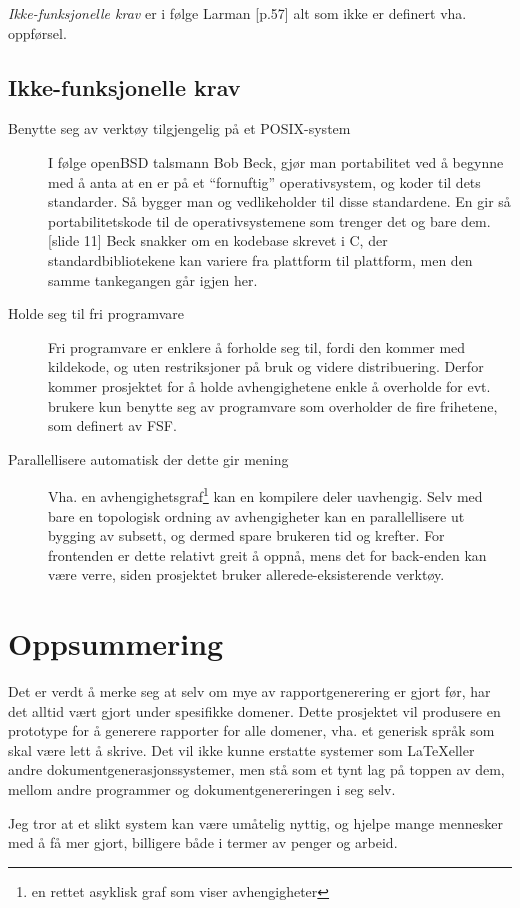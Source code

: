 \documentclass[11pt]{article}
\begin{document}
\emph{Ikke-funksjonelle krav} er i følge Larman \cite{Larman2005}[p.57] alt som ikke er definert vha. oppførsel.

\subsection{Ikke-funksjonelle krav}
\label{subsec:ikke-funksjonelle-krav}
\begin{description}
\item [Benytte seg av verktøy tilgjengelig på et POSIX-system]
  I følge openBSD talsmann Bob Beck,
  gjør man portabilitet ved å begynne med å anta at en er på et ``fornuftig'' operativsystem,
  og koder til dets standarder.
  Så bygger man og vedlikeholder til disse standardene.
  En gir så portabilitetskode til de operativsystemene som trenger det og bare dem. \cite{openbsd-bsdcan2014-libressl}[slide 11]
  Beck snakker om en kodebase skrevet i C, der standardbibliotekene kan variere fra plattform til plattform, men den samme tankegangen går igjen her.
\item [Holde seg til fri programvare]
  Fri programvare er enklere å forholde seg til, fordi den kommer med kildekode, og uten restriksjoner på bruk og videre distribuering.\cite{GNU-MANIFESTO}
  Derfor kommer prosjektet for å holde avhengighetene enkle å overholde for evt. brukere kun benytte seg av programvare som overholder de fire frihetene, som definert av FSF.
\item [Parallellisere automatisk der dette gir mening]
  Vha. en avhengighetsgraf\footnote{en rettet asyklisk graf som viser avhengigheter} kan en kompilere deler uavhengig.
  Selv med bare en topologisk ordning av avhengigheter kan en parallellisere ut bygging av subsett,
  og dermed spare brukeren tid og krefter.
  For frontenden er dette relativt greit å oppnå, mens det for back-enden kan være verre,
  siden prosjektet bruker allerede-eksisterende verktøy.
\end{description}

\section{Oppsummering}
Det er verdt å merke seg at selv om mye av rapportgenerering er gjort før, har det alltid vært gjort under spesifikke domener. Dette prosjektet vil produsere en prototype for å generere rapporter for alle domener, vha. et generisk språk som skal være lett å skrive.
Det vil ikke kunne erstatte systemer som \LaTeX  eller andre dokumentgenerasjonssystemer, men stå som et tynt lag på toppen av dem, mellom andre programmer og dokumentgenereringen i seg selv.

Jeg tror at et slikt system kan være umåtelig nyttig, og hjelpe mange mennesker med å få mer gjort, billigere både i termer av penger og arbeid.

{}    

\end{document}

